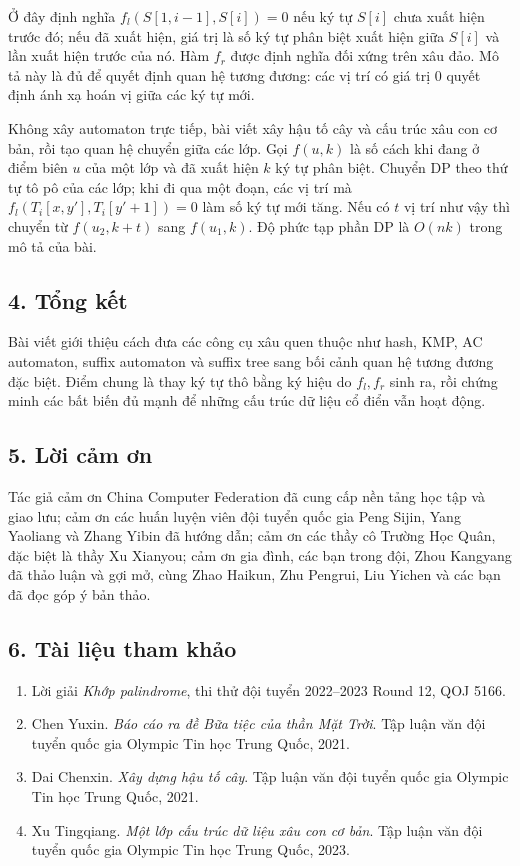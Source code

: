 \documentclass[11pt]{article}
\begin{document}
Ở đây định nghĩa \(f_l(S[1,i-1],S[i])=0\) nếu ký tự \(S[i]\) chưa xuất hiện
trước đó; nếu đã xuất hiện, giá trị là số ký tự phân biệt xuất hiện giữa
\(S[i]\) và lần xuất hiện trước của nó. Hàm \(f_r\) được định nghĩa đối xứng
trên xâu đảo. Mô tả này là đủ để quyết định quan hệ tương đương: các vị trí
có giá trị \(0\) quyết định ánh xạ hoán vị giữa các ký tự mới.

Không xây automaton trực tiếp, bài viết xây hậu tố cây và cấu trúc xâu con cơ
bản, rồi tạo quan hệ chuyển giữa các lớp. Gọi \(f(u,k)\) là số cách khi đang ở
điểm biên \(u\) của một lớp và đã xuất hiện \(k\) ký tự phân biệt. Chuyển DP
theo thứ tự tô pô của các lớp; khi đi qua một đoạn, các vị trí mà
\(f_l(T_i[x,y'],T_i[y'+1])=0\) làm số ký tự mới tăng. Nếu có \(t\) vị trí như
vậy thì chuyển từ \(f(u_2,k+t)\) sang \(f(u_1,k)\). Độ phức tạp phần DP là
\(O(nk)\) trong mô tả của bài.

\subsection*{4. Tổng kết}

Bài viết giới thiệu cách đưa các công cụ xâu quen thuộc như hash, KMP, AC
automaton, suffix automaton và suffix tree sang bối cảnh quan hệ tương đương
đặc biệt. Điểm chung là thay ký tự thô bằng ký hiệu do \(f_l,f_r\) sinh ra,
rồi chứng minh các bất biến đủ mạnh để những cấu trúc dữ liệu cổ điển vẫn hoạt
động.

\subsection*{5. Lời cảm ơn}

Tác giả cảm ơn China Computer Federation đã cung cấp nền tảng học tập và giao
lưu; cảm ơn các huấn luyện viên đội tuyển quốc gia Peng Sijin, Yang Yaoliang
và Zhang Yibin đã hướng dẫn; cảm ơn các thầy cô Trường Học Quân, đặc biệt là
thầy Xu Xianyou; cảm ơn gia đình, các bạn trong đội, Zhou Kangyang đã thảo
luận và gợi mở, cùng Zhao Haikun, Zhu Pengrui, Liu Yichen và các bạn đã đọc
góp ý bản thảo.

\subsection*{6. Tài liệu tham khảo}

\begin{enumerate}
  \item Lời giải \emph{Khớp palindrome}, thi thử đội tuyển 2022--2023 Round 12,
  QOJ 5166.
  \item Chen Yuxin. \emph{Báo cáo ra đề Bữa tiệc của thần Mặt Trời}. Tập luận
  văn đội tuyển quốc gia Olympic Tin học Trung Quốc, 2021.
  \item Dai Chenxin. \emph{Xây dựng hậu tố cây}. Tập luận văn đội tuyển quốc
  gia Olympic Tin học Trung Quốc, 2021.
  \item Xu Tingqiang. \emph{Một lớp cấu trúc dữ liệu xâu con cơ bản}. Tập luận
  văn đội tuyển quốc gia Olympic Tin học Trung Quốc, 2023.
\end{enumerate}
\end{document}
